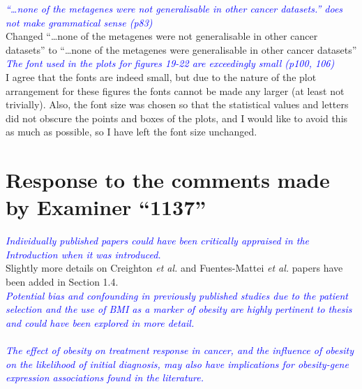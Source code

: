 \documentclass[a4paper, 12pt]{article}
\begin{document}
\noindent
\textcolor{blue}{
\textit{``\ldots none of the metagenes were not generalisable in other cancer datasets.'' does not make grammatical sense (p83)
}
}\\

\noindent
Changed ``\ldots none of the metagenes were not generalisable in other cancer datasets'' to ``\ldots none of the metagenes were generalisable in other cancer datasets''
\\

\noindent
\textcolor{blue}{
\textit{The font used in the plots for figures 19-22 are exceedingly small (p100, 106)
}
}\\

\noindent
I agree that the fonts are indeed small, but due to the nature of the plot arrangement for these figures the fonts cannot be made any larger (at least not trivially).
Also, the font size was chosen so that the statistical values and letters did not obscure the points and boxes of the plots, and I would like to avoid this as much as possible, so I have left the font size unchanged.
\\

\newpage

\section*{Response to the comments made by Examiner ``1137''}
\label{sec:response_to_comments_from_examiner_1137}

\noindent
\textcolor{blue}{
	\textit{Individually published papers could have been critically appraised in the Introduction when it was introduced.
	}
}\\

\noindent
Slightly more details on Creighton \textit{et al.} and Fuentes-Mattei \textit{et al.} papers have been added in Section 1.4.
\\

\noindent
\textcolor{blue}{
	\textit{Potential bias and confounding in previously published studies due to the patient selection and the use of BMI as a marker of obesity are highly pertinent to thesis and could have been explored in more detail.
	}
}\\

\noindent
\\

\noindent
\textcolor{blue}{
	\textit{The effect of obesity on treatment response in cancer, and the influence of obesity on the likelihood of initial diagnosis, may also have implications for obesity-gene expression associations found in the literature.
	}
}\\
\end{document}

